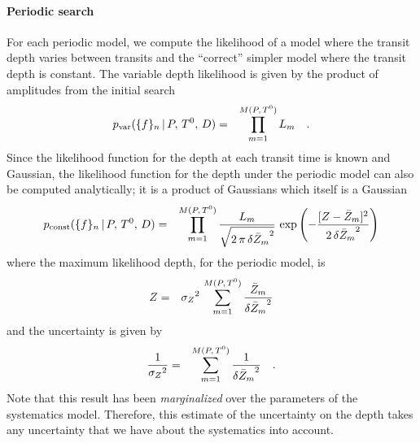 \paragraph{Periodic search}

For each periodic model, we compute the likelihood of a model where the
transit depth varies between transits and the ``correct'' simpler model where
the transit depth is constant.
The variable depth likelihood is given by the product of amplitudes from the
initial search
\begin{eqnarray}
p_\mathrm{var}(\{{f}\}_n\,|\,{P},\,{T^0},\,{D}) &=&
\prod_{m=1}^{M({P},\,{T^0})} L_m \quad.
\end{eqnarray}
Since the likelihood function for the depth at each transit time is known and
Gaussian, the likelihood function for the depth under the periodic model can
also be computed analytically; it is a product of Gaussians which itself is a
Gaussian
\begin{eqnarray}
p_\mathrm{const}(\{{f}\}_n\,|\,{P},\,{T^0},\,{D}) &=&
\prod_{m=1}^{M({P},\,{T^0})}
    \frac{L_m}{\sqrt{2\,\pi\,{\delta\bar{{Z}}_m}^2}}\,\exp \left(
        -\frac{[{Z} - \bar{{Z}}_m]^2}{2\,{\delta\bar{{Z}}_m}^2}
    \right)
\end{eqnarray}
where the maximum likelihood depth, for the periodic model, is
\begin{eqnarray}\eqlabel{periodic-depth}
\depth &=& {\sigma_\depth}^2\,\sum_{m=1}^{M(\period,\,\phase)}
    \frac{\bar{\depth}_m}{{\delta\bar{\depth}_m}^2}
\end{eqnarray}
and the uncertainty is given by
\begin{eqnarray}\eqlabel{periodic-depth-uncert}
\frac{1}{{\sigma_\depth}^2} &=& \sum_{m=1}^{M(\period,\,\phase)}
    \frac{1}{{\delta\bar{\depth}_m}^2} \quad.
\end{eqnarray}
Note that this result has been \emph{marginalized} over the parameters of the
systematics model.
Therefore, this estimate of the uncertainty on the depth takes any
uncertainty that we have about the systematics into account.

